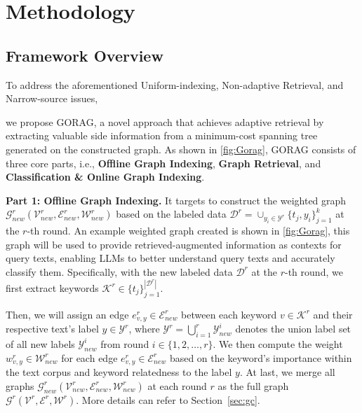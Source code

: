 
\section{Methodology}\label{sec:methdology}
\subsection{Framework Overview}


	To address the aforementioned Uniform-indexing, Non-adaptive Retrieval, and Narrow-source issues,
	
we propose GORAG, a novel approach that achieves adaptive retrieval by extracting valuable side information from a minimum-cost spanning tree generated on the constructed graph. 
As shown in \autoref{fig:Gorag}, GORAG consists of three core parts, i.e., \textcolor{myblue}{\textbf{Offline Graph Indexing}}, \textcolor{myorange}{\textbf{Graph Retrieval}}, and \textcolor{mygreen}{\textbf{Classification \& Online Graph Indexing}}.
 


\noindent\textbf{Part 1: Offline Graph Indexing. } 
It targets to construct the weighted graph $\mathcal{G}^r_{new}(\mathcal{V}^r_{new}, \mathcal{E}^r_{new},\mathcal{W}^r_{new})$ based on the labeled data $\mathcal{D}^r=\cup_{y_i \in \mathcal{Y}^r}\{t_j,y_i\}_{j=1}^k$ 
	at the $r$-th round. 
	An example weighted graph created is shown in \autoref{fig:Gorag}, this graph will be used to provide retrieved-augmented information as contexts for query texts, 
	enabling LLMs to better understand query texts and accurately classify them.
	Specifically, with the new labeled data $\mathcal{D}^r$ at the $r$-th round, we first extract keywords $\mathcal{K}^r \in \{t_j\}_{j=1}^{|\mathcal{D}^r|}$.
	 
	Then, we will assign an edge $e^r_{v,y} \in \mathcal{E}^r_{new}$ between each keyword  $v \in \mathcal{K}^r$ and their respective text's label $y\in \mathcal{Y}^r$, {\color{black}where $\mathcal{Y}^r = \bigcup_{i=1}^r \mathcal{Y}^i_{new}$ denotes the union label set 
		of all new labels $\mathcal{Y}^i_{new}$ from round $i\in\{1, 2, \dots, r\}$.}
	We then compute the weight $w^r_{v,y} \in \mathcal{W}^r_{new}$ for each edge $e^r_{v,y} \in \mathcal{E}^r_{new}$ based on the keyword's importance within the text corpus and keyword relatedness to the label $y$. 
	At last, we merge all graphs $\mathcal{G}^r_{new}(\mathcal{V}^r_{new}, \mathcal{E}^r_{new},\mathcal{W}^r_{new})$ at each round $r$ as the full graph $\mathcal{G}^r(\mathcal{V}^r, \mathcal{E}^r,\mathcal{W}^r)$.
	More details can refer to Section~\ref{sec:gc}.
	
